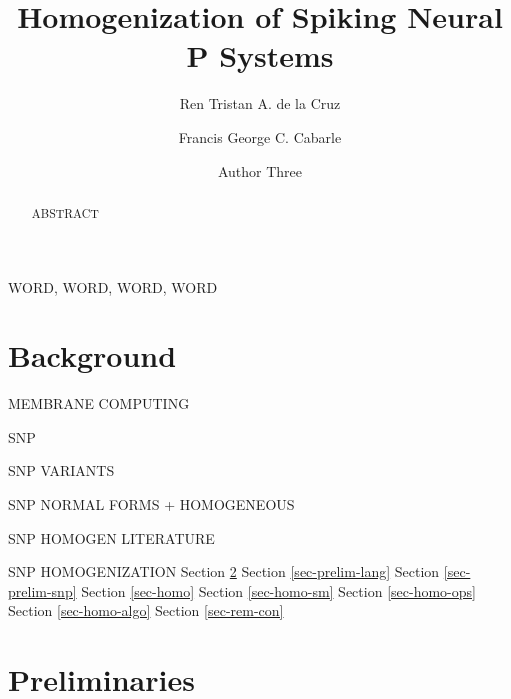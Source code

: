 \documentclass[]{elsarticle}
\theoremstyle{definition}
\theoremstyle{definition}
\begin{document}

\begin{frontmatter}

\title{Homogenization of Spiking Neural P Systems}

\author[1]{Ren Tristan A. de la Cruz}
\author[1]{Francis George C. Cabarle}
\author[2]{Author Three}

\address[1]
{
Algorithms and Complexity Lab, 
Department of Computer Science, 
University of the Philippines Diliman,
1101, Quezon City, Philippines.
}
\address[2]{(address 2)}


\begin{abstract}
ABSTRACT
\end{abstract}

\begin{keyword}
WORD, WORD, WORD, WORD
\end{keyword}

\end{frontmatter}


\section{Background}

MEMBRANE COMPUTING

SNP

\cite{ionescu-2006-snp}
\cite{chen-2008-snp-e}
\cite{HSNP}
\cite{HISNP}
\cite{HSNP-R}

\cite{HSNP-S}
\cite{HSNP-A}

SNP VARIANTS

SNP NORMAL FORMS + HOMOGENEOUS

SNP HOMOGEN LITERATURE

SNP HOMOGENIZATION
Section \ref{sec-prelim}
Section \ref{sec-prelim-lang}
Section \ref{sec-prelim-snp}
Section \ref{sec-homo}
Section \ref{sec-homo-sm}
Section \ref{sec-homo-ops}
Section \ref{sec-homo-algo}
Section \ref{sec-rem-con}

\section{Preliminaries} \label{sec-prelim}
\end{document}
